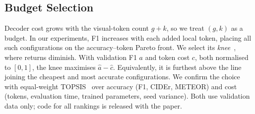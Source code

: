\subsection{Budget Selection}
\label{sec:budget}

Decoder cost grows with the visual-token count $g+k$, so we treat $(g,k)$ as a budget. In our
experiments, F1 increases with each added local token, placing all such configurations on the
accuracy--token Pareto front. We select its \emph{knee}~\cite{satopaa2011kneedle}, where returns
diminish. With validation F1 $a$ and token cost $c$, both normalised to $[0,1]$, the knee maximises
$\hat a-\hat c$.
Equivalently, it is furthest above the line joining the cheapest and most accurate configurations.
We confirm the choice with equal-weight TOPSIS~\cite{hwang1981topsis} over accuracy (F1, CIDEr,
METEOR) and cost (tokens, evaluation time, trained parameters, seed variance). Both use validation
data only; code for all rankings is released with the paper.
